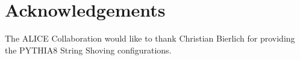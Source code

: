 \documentclass[ALICE,manyauthors]{cernphprep}
\begin{document}
\begin{titlepage}
\begin{abstract}


\end{abstract}

\end{titlepage}

\setcounter{page}{2}






\newenvironment{acknowledgement}{\relax}{\relax}
\begin{acknowledgement}
\section*{Acknowledgements}
\noindent The ALICE Collaboration would like to thank Christian Bierlich for providing the PYTHIA8 String Shoving configurations.
\end{acknowledgement}
\end{document}
